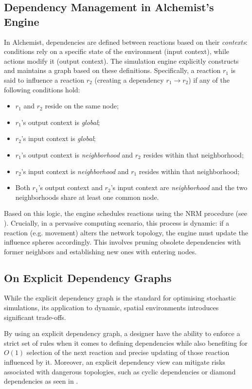 \subsection{Dependency Management in Alchemist's Engine}\label{ssec:alchemist_engine}
In Alchemist, dependencies are defined between reactions based on their
\emph{contexts}: conditions rely on a specific state of the environment (input
context), while actions modify it (output context). The simulation engine
explicitly constructs and maintains a graph based on these definitions.
Specifically, a reaction $r_1$ is said to influence a reaction $r_2$ (creating
a dependency $r_1 \to r_2$) if any of the following conditions hold:
%
\begin{itemize}
	\item $r_1$ and $r_2$ reside on the same node;
	\item $r_1$'s output context is \emph{global};
	\item $r_2$'s input context is \emph{global};
	\item $r_1$'s output context is \emph{neighborhood} and $r_2$ resides
	      within that neighborhood;
	\item $r_2$'s input context is \emph{neighborhood} and $r_1$ resides within
	      that neighborhood;
	\item Both $r_1$'s output context and $r_2$'s input context are
	      \emph{neighborhood} and the two neighborhoods share at least one
	      common node.
\end{itemize}
%
Based on this logic, the engine schedules reactions using the \ac{NRM}
procedure (see ). Crucially, in a pervasive computing
scenario, this process is dynamic: if a reaction (e.g. movement) alters the
network topology, the engine must update the influence spheres accordingly.
This involves pruning obsolete dependencies with former neighbors and
establishing new ones with entering nodes.

\subsection{On Explicit Dependency Graphs}
While the explicit dependency graph is the standard for optimising stochastic
simulations, its application to dynamic, spatial environments introduces
significant trade-offs.

By using an explicit dependency graph, a designer have the ability to enforce a
strict set of rules when it comes to defining dependencies while also
benefiting for $O(1)$ selection of the next reaction and precise updating of
those reaction influenced by it. Moreover, an explicit dependency view can
mitigate risks associated with dangerous topologies, such as cyclic
dependencies or diamond dependencies as seen in .

